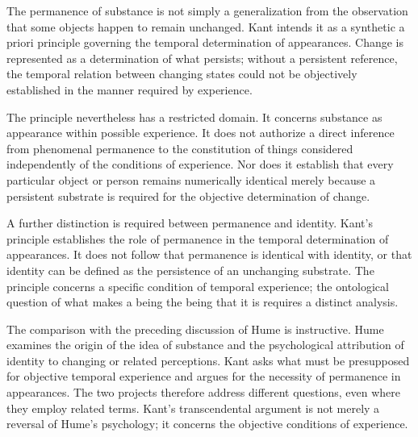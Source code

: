 The permanence of substance is not simply
a generalization from the observation that
some objects happen to remain unchanged.
Kant intends it as a synthetic a priori
principle governing the temporal determination
of appearances. Change is represented as
a determination of what persists; without
a persistent reference, the temporal relation
between changing states could not be
objectively established in the manner
required by experience.

\label{para:VS.B01.P01.C08.S10.SS09.P003}

The principle nevertheless has a restricted
domain. It concerns substance as appearance
within possible experience. It does not
authorize a direct inference from phenomenal
permanence to the constitution of things
considered independently of the conditions
of experience. Nor does it establish that
every particular object or person remains
numerically identical merely because a
persistent substrate is required for the
objective determination of change.

\label{para:VS.B01.P01.C08.S10.SS09.P004}

A further distinction is required between
permanence and identity. Kant's principle
establishes the role of permanence in the
temporal determination of appearances.
It does not follow that permanence is
identical with identity, or that identity
can be defined as the persistence of an
unchanging substrate. The principle concerns
a specific condition of temporal experience;
the ontological question of what makes
a being the being that it is requires
a distinct analysis.

\label{para:VS.B01.P01.C08.S10.SS09.P005}

The comparison with the preceding discussion
of Hume is instructive. Hume examines the
origin of the idea of substance and the
psychological attribution of identity to
changing or related perceptions. Kant
asks what must be presupposed for objective
temporal experience and argues for the
necessity of permanence in appearances.
The two projects therefore address different
questions, even where they employ related
terms. Kant's transcendental argument is
not merely a reversal of Hume's psychology;
it concerns the objective conditions of
experience.
\cite{KantCritiquePureReason}

\label{para:VS.B01.P01.C08.S10.SS09.P006}

